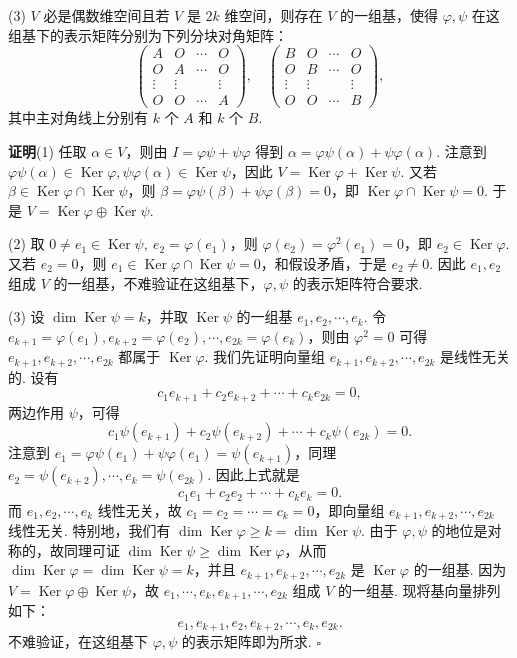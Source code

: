 \documentclass[UTF8, 12pt, fontset=fandol, oneside]{ctexart}
\begin{document}
(3) $V$ 必是偶数维空间且若 $V$ 是 $2k$ 维空间，则存在 $V$ 的一组基，使得 $\varphi,\psi$ 在这组基下的表示矩阵分别为下列分块对角矩阵：
\[
\left(\begin{array}{cccc}
A & O & \cdots & O\\
O & A & \cdots & O\\
\vdots & \vdots &        & \vdots\\
O & O & \cdots & A
\end{array}\right),\quad
\left(\begin{array}{cccc}
B & O & \cdots & O\\
O & B & \cdots & O\\
\vdots & \vdots &        & \vdots\\
O & O & \cdots & B
\end{array}\right),
\]
其中主对角线上分别有 $k$ 个 $A$ 和 $k$ 个 $B$.

\noindent\textbf{证明}\quad (1) 任取 $\alpha\in V$，则由 $I=\varphi\psi+\psi\varphi$ 得到 $\alpha=\varphi\psi(\alpha)+\psi\varphi(\alpha)$. 注意到 $\varphi\psi(\alpha)\in\operatorname{Ker}\varphi,\psi\varphi(\alpha)\in\operatorname{Ker}\psi$，因此 $V=\operatorname{Ker}\varphi+\operatorname{Ker}\psi$. 又若 $\beta\in\operatorname{Ker}\varphi\cap\operatorname{Ker}\psi$，则 $\beta=\varphi\psi(\beta)+\psi\varphi(\beta)=0$，即 $\operatorname{Ker}\varphi\cap\operatorname{Ker}\psi=0$. 于是 $V=\operatorname{Ker}\varphi\oplus\operatorname{Ker}\psi$.

(2) 取 $0\ne e_1\in\operatorname{Ker}\psi,\ e_2=\varphi(e_1)$，则 $\varphi(e_2)=\varphi^2(e_1)=0$，即 $e_2\in\operatorname{Ker}\varphi$. 又若 $e_2=0$，则 $e_1\in\operatorname{Ker}\varphi\cap\operatorname{Ker}\psi=0$，和假设矛盾，于是 $e_2\ne0$. 因此 $e_1,e_2$ 组成 $V$ 的一组基，不难验证在这组基下，$\varphi,\psi$ 的表示矩阵符合要求.

(3) 设 $\dim\operatorname{Ker}\psi=k$，并取 $\operatorname{Ker}\psi$ 的一组基 $e_1,e_2,\cdots,e_k$. 令 $e_{k+1}=\varphi(e_1),e_{k+2}=\varphi(e_2),\cdots,e_{2k}=\varphi(e_k)$，则由 $\varphi^2=0$ 可得 $e_{k+1},e_{k+2},\cdots,e_{2k}$ 都属于 $\operatorname{Ker}\varphi$. 我们先证明向量组 $e_{k+1},e_{k+2},\cdots,e_{2k}$ 是线性无关的. 设有
\[
c_1e_{k+1}+c_2e_{k+2}+\cdots+c_ke_{2k}=0,
\]
两边作用 $\psi$，可得
\[
c_1\psi(e_{k+1})+c_2\psi(e_{k+2})+\cdots+c_k\psi(e_{2k})=0.
\]
注意到 $e_1=\varphi\psi(e_1)+\psi\varphi(e_1)=\psi(e_{k+1})$，同理 $e_2=\psi(e_{k+2}),\cdots,e_k=\psi(e_{2k})$. 因此上式就是
\[
c_1e_1+c_2e_2+\cdots+c_ke_k=0.
\]
而 $e_1,e_2,\cdots,e_k$ 线性无关，故 $c_1=c_2=\cdots=c_k=0$，即向量组 $e_{k+1},e_{k+2},\cdots,e_{2k}$ 线性无关. 特别地，我们有 $\dim\operatorname{Ker}\varphi\ge k=\dim\operatorname{Ker}\psi$. 由于 $\varphi,\psi$ 的地位是对称的，故同理可证 $\dim\operatorname{Ker}\psi\ge\dim\operatorname{Ker}\varphi$，从而 $\dim\operatorname{Ker}\varphi=\dim\operatorname{Ker}\psi=k$，并且 $e_{k+1},e_{k+2},\cdots,e_{2k}$ 是 $\operatorname{Ker}\varphi$ 的一组基. 因为 $V=\operatorname{Ker}\varphi\oplus\operatorname{Ker}\psi$，故 $e_1,\cdots,e_k,e_{k+1},\cdots,e_{2k}$ 组成 $V$ 的一组基. 现将基向量排列如下：
\[
e_1,e_{k+1},e_2,e_{k+2},\cdots,e_k,e_{2k}.
\]
不难验证，在这组基下 $\varphi,\psi$ 的表示矩阵即为所求. $\square$
\end{document}
